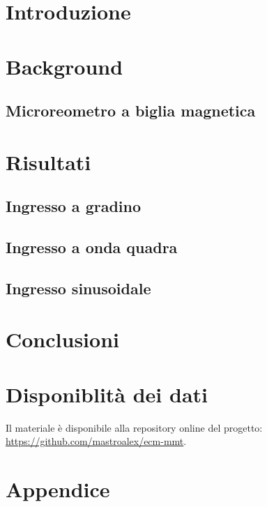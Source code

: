 \section{Introduzione}



\textcolor{blue}{\lipsum[1]}

\section{Background}

\textcolor{blue}{\lipsum[1-4]}

\subsection{Microreometro a biglia magnetica}




\section{Risultati}

\subsection{Ingresso a gradino}




\textcolor{blue}{\lipsum[1-2]}

\subsection{Ingresso a onda quadra}




\textcolor{blue}{\lipsum[1-2]}

\subsection{Ingresso sinusoidale}




\textcolor{blue}{\lipsum[1-2]}



\section{Conclusioni}

\textcolor{blue}{\lipsum[1-2]}


\raggedbottom


\raggedbottom
\pagebreak
\section*{Disponiblità dei dati}

Il materiale è disponibile alla repository online del progetto: \url{https://github.com/mastroalex/ecm-mmt}.

\printbibliography[title=Riferimenti]

\clearpage
\onecolumn
\section*{Appendice}

